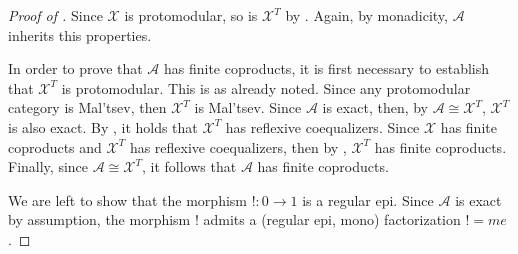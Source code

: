 \begin{subbox}{}
\begin{proof}[\textit{Proof of }]
    Since $\mathcal{X}$ is protomodular, so is $\mathcal{X}^T$ by . Again, by monadicity, $\mathcal{A}$ inherits this properties.

    In order to prove that $\mathcal{A}$ has finite coproducts, it is first necessary to establish that $\mathcal{X}^T$ is protomodular. This is as already noted. Since any protomodular category is Mal'tsev, then $\mathcal{X}^T$ is Mal'tsev. Since $\mathcal{A}$ is exact, then, by $\mathcal{A} \cong \mathcal{X}^T$, $\mathcal{X}^T$ is also exact. By , it holds that $\mathcal{X}^T$ has reflexive coequalizers. Since $\mathcal{X}$ has finite coproducts and $\mathcal{X}^T$ has reflexive coequalizers, then by , $\mathcal{X}^T$ has finite coproducts. Finally, since $\mathcal{A} \cong \mathcal{X}^T$, it follows that $\mathcal{A}$  has finite coproducts.

    We are left to show that the morphism $!:0 \to 1$ is a regular epi. Since $\mathcal{A}$ is exact by assumption, the morphism $!$ admits a (regular epi, mono) factorization $! = me$.
    

\end{proof}
\end{subbox}
